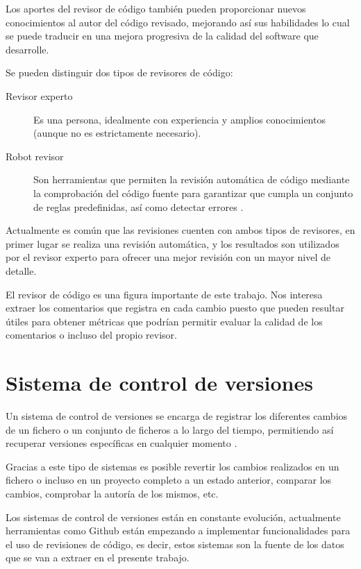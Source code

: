 Los aportes del revisor de código también pueden proporcionar nuevos conocimientos al autor del código revisado, mejorando así sus habilidades lo cual se puede traducir en una mejora progresiva de la calidad del software que desarrolle.

Se pueden distinguir dos tipos de revisores de código:

\begin{description}
	\item[Revisor experto] Es una persona, idealmente con experiencia y amplios conocimientos (aunque no es estrictamente necesario).
	\item[Robot revisor] Son herramientas que permiten la revisión automática de código mediante la comprobación del código fuente para garantizar que cumpla un conjunto de reglas predefinidas, así como detectar errores \cite{wiki:001}.
\end{description}

Actualmente es común que las revisiones cuenten con ambos tipos de revisores, en primer lugar se realiza una revisión automática, y los resultados son utilizados por el revisor experto para ofrecer una mejor revisión con un mayor nivel de detalle.

El revisor de código es una figura importante de este trabajo. Nos interesa extraer los comentarios que registra en cada cambio puesto que pueden resultar útiles para obtener métricas que podrían permitir evaluar la calidad de los comentarios o incluso del propio revisor.

\section{Sistema de control de versiones}

Un sistema de control de versiones se encarga de registrar los diferentes cambios de un fichero o un conjunto de ficheros a lo largo del tiempo, permitiendo así recuperar versiones específicas en cualquier momento \cite{Chacon:2014:PG:2695634}.

Gracias a este tipo de sistemas es posible revertir los cambios realizados en un fichero o incluso en un proyecto completo a un estado anterior, comparar los cambios, comprobar la autoría de los mismos, etc.

Los sistemas de control de versiones están en constante evolución, actualmente herramientas como Github están empezando a implementar funcionalidades para el uso de revisiones de código, es decir, estos sistemas son la fuente de los datos que se van a extraer en el presente trabajo.

